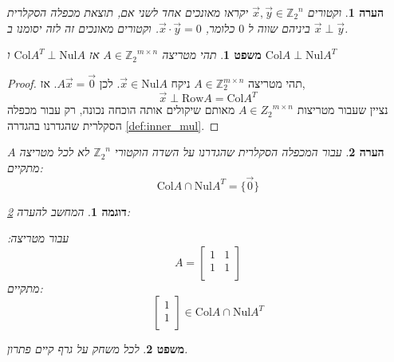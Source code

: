 \documentclass[12pt,leqno]{article}
\theoremstyle{theoremdd}
\newtheorem{theorem}{משפט}[section]
\newtheorem{example}{דוגמה}[section]
\newtheorem{comm}{הערה}[section]
\newcommand{\Zn}{{\mathbb{Z}_2}^n}
\newcommand{\Col}{\mathrm{Col}}
\newcommand{\Nul}{\mathrm{Nul}}
\begin{document}
\begin{comm}
    וקטורים 
    $\vec x, \vec y \in \Zn $
    יקראו מאונכים אחד לשני
    אם,
    תוצאת מכפלה הסקלרית ביניהם שווה
    ל
    $0$
    כלומר,
    $\vec{x} \cdot \vec{y} = 0$.
    וקטורים מאונכים זה לזה יסומנו ב
    $\vec x \perp \vec y$.
\end{comm}
\begin{theorem}
    \label{the: Nul A and Col AT}
    תהי מטריצה 
    $A \in {\mathbb{Z}_2}^{m \times n }$
    אז 
    $\Col A^T \perp \Nul A$
    ו
    $\Col A \perp \Nul A^T$
\end{theorem}
\begin{proof}
    תהי 
    מטריצה
    $A \in \mathbb{Z}_2^{m \times n}$
    ניקח 
    $\vec x \in \mathrm{Nul} A$.
    לכן
    $A\vec x=\vec 0$. 
    אז,
    \[
        \vec x \perp \mathrm{Row}A=\mathrm{Col} A^T
    \]
    נציין 
    שעבור 
    מטריצות 
    $A \in {Z_2}^{m \times n}$
    מאותם שיקולים אותה הוכחה נכונה,
    רק עבור מכפלה הסקלרית שהגדרנו 
    בהגדרה 
    \ref{def:inner_mul}.
\end{proof}
\begin{comm}
    \label{comm:not-all-A-ColA-intersection-NulA-empty}
    עבור 
    המכפלה הסקלרית שהגדרנו
    על השדה הוקטורי 
    $\Zn$
    לא לכל מטריצה 
    $A$
    מתקיים:
    \[\Col A \cap \Nul A^T = \{ \vec{0}\}\]
\end{comm}
\begin{example}
    המחשב להערה 
    \ref{comm:not-all-A-ColA-intersection-NulA-empty}:
    
    עבור מטריצה:
    \[A = 
    \begin{bmatrix}
        1 & 1 \\
        1 & 1 \\
    \end{bmatrix}\]
    מתקיים:
    \[
    \begin{bmatrix}
        1 \\
        1 \\
    \end{bmatrix}
    \in \Col A \cap \Nul A^T \]
\end{example}
\begin{theorem}
    \label{thrm: clean game has solution}
    לכל משחק על גרף קיים פתרון.
\end{theorem}
\end{document}

